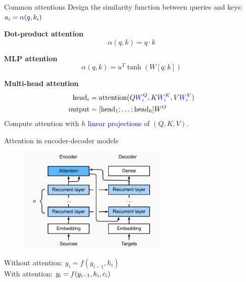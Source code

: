 \documentclass[usenames,dvipsnames,notes]{beamer}
\begin{document}
\begin{frame}
    {Common attentions}
    Design the similarity function between queries and keys:
    ${a_i}= {\color{blue}\alpha}({q}, k_i)$

    \textbf{Dot-product attention}
    $$
    \alpha(q, k) = q\cdot k
    $$

    \textbf{MLP attention}
    $$
    \alpha(q, k) = u^T \tanh(W[q;k]) 
    $$

    \textbf{Multi-head attention}
    \begin{align*}
        \text{head}_i &= \text{attention}(Q{\color{blue}W^Q_i}, K{\color{blue}W^K_i}, V{\color{blue}W^V_i}) \\
    \text{output} &= [\text{head}_1; \ldots; \text{head}_h]W^O
    \end{align*}
    Compute attention with $h$ \textcolor{blue}{linear projections} of $(Q, K, V)$.
\end{frame}

\begin{frame}
    {Attention in encoder-decoder models}
    \begin{figure}
        \includegraphics[height=5cm]{figures/s2s-attention}
    \end{figure}
    Without attention: $y_i = f(y_{i-1}, h_i)$\\
    With attention: $y_i = f(y_{i-1}, h_i, {\color{blue}c_i})$
\end{frame}
\end{document}
